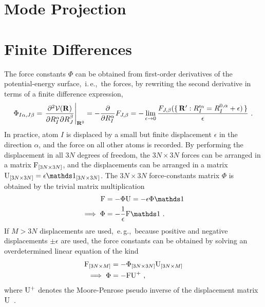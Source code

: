 
\section{Mode Projection}

\newpage

\section{Finite Differences}
The force constants $\Phi$ can be obtained from first-order derivatives of the potential-energy surface,~i.\,e.,~the forces, by rewriting the second derivative in terms of a finite difference expression,
\begin{align}
	\Phi_{I \alpha, J \beta}
		= \left.\frac{\partial^{2} \mathcal{V}(\mathbf{R})}{\partial R_{I}^{\alpha} \partial R_{J}^{\beta}}\right|_{\mathbf{R}^{0}}
		= - \frac{\partial}{\partial R_I^\alpha} F_{J, \beta}
		= - \lim_{\epsilon \to 0}
			\frac{F_{J, \beta} (\set{\b R': R^{\prime \alpha}_I = R^{0, \alpha}_I + \epsilon )}}{\epsilon}
		~.
\label{eq:FC2_finite}
\end{align}
In practice, atom $I$ is displaced by a small but finite displacement $\epsilon$ in the direction $\alpha$, and the force on all other atoms is recorded. By performing the displacement in all $3N$ degrees of freedom, the $3N \times 3N$ forces can be arranged in a matrix ${\rm F}_{[3N \times 3N]}$, and the displacements can be arranged in a matrix ${\rm U}_{[3N \times 3N]} = \epsilon \mathds 1_{[3N \times 3N]}$. The $3N \times 3N$ force-constants matrix $\Phi$ is obtained by the trivial matrix multiplication
\begin{align}
{\rm F }
	&= - \Phi {\rm U} 
	= - \epsilon \Phi \mathds 1
	\label{eq:finite.diff.1}
	\\
	\implies
	\Phi &= - \frac{1}{\epsilon} {\rm F} \mathds 1~.
\end{align}
If $M > 3N$ displacements are used,~e.\,g.,~because positive and negative displacements $\pm \epsilon$ are used, the force constants can be obtained by solving an overdetermined linear equation of the kind
\begin{align}
	{\rm F}_{[3N \times M]} &= - \Phi_{[3N \times 3N]} {\rm U}_{[3N \times M]} \\
	\implies
	\Phi &= - {\rm F} {\rm U}^{+}~,
	\label{eq:phi.pseudo.1}
\end{align}
where ${\rm U}^{+}$ denotes the Moore-Penrose pseudo inverse of the displacement matrix $\rm U$~\cite{Penrose1955,Parlinski1997}.

